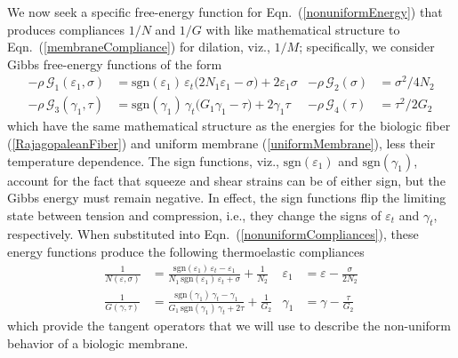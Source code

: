 We now seek a specific free-energy function for Eqn.~(\ref{nonuniformEnergy}) that produces compliances $1/N$ and $1/G$ with like mathematical structure to Eqn.~(\ref{membraneCompliance}) for dilation, viz., $1/M$; specifically, we consider Gibbs free-energy functions of the form
\begin{subequations}
    \label{nonuniformComplianceEnergies}
    \begin{align}
    -\rho \, \mathcal{G}_1 ( \varepsilon_1 , \sigma ) & = \mathrm{sgn} ( \varepsilon_1 ) \, \varepsilon_t \bigl( 2 N_1 \varepsilon_1 - \sigma \bigr) + 2 \varepsilon_1 \sigma &
    -\rho \, \mathcal{G}_2 ( \sigma ) & = \sigma^2 / 4 N_2
    \label{squeezeEnergy} \\
    -\rho \, \mathcal{G}_3 ( \gamma_1 , \tau ) & = \mathrm{sgn} ( \gamma_1 ) \, \gamma_t \bigl( G_1 \gamma_1 - \tau \bigr) + 2 \gamma_1 \tau &
    -\rho \, \mathcal{G}_4 ( \tau ) & = \tau^2 / 2 G_2 
    \label{shearEnergy}
    \end{align}
\end{subequations}
which have the same mathematical structure as the energies for the biologic fiber (\ref{RajagopaleanFiber}) and uniform membrane (\ref{uniformMembrane}), less their temperature dependence.  The sign functions, viz., $\mathrm{sgn}( \varepsilon_1 )$ and $\mathrm{sgn} ( \gamma_1 )$, account for the fact that squeeze and shear strains can be of either sign, but the Gibbs energy must remain negative.  In effect, the sign functions flip the limiting state between tension and compression, i.e., they change the signs of $\varepsilon_t$ and $\gamma_t$, respectively.  When substituted into Eqn.~(\ref{nonuniformCompliances}), these energy functions produce the following thermo\-elastic compliances
\begin{subequations}
    \label{nonuniformComplianceFns}
    \begin{align}
    \frac{1}{N(\varepsilon , \sigma)} & = \frac{ \mathrm{sgn} (\varepsilon_1) \, \varepsilon_t - \varepsilon_1}{N_1 \, \mathrm{sgn} (\varepsilon_1) \, \varepsilon_t + \sigma} + \frac{1}{N_2} &
    \varepsilon_1 & = \varepsilon - \frac{\sigma}{2N_2}
    \label{squeezeCompliance2D} \\
    \frac{1}{G(\gamma , \tau)} & = \frac{ \mathrm{sgn} (\gamma_1) \, \gamma_t - \gamma_1}{G_1 \, \mathrm{sgn} (\gamma_1) \, \gamma_t + 2 \tau} + \frac{1}{G_2} & 
    \gamma_1 & = \gamma - \frac{\tau}{G_2}
    \label{shearCompliance2D}
    \end{align}
\end{subequations}
which provide the tangent operators that we will use to describe the non-uniform behavior of a biologic membrane.

